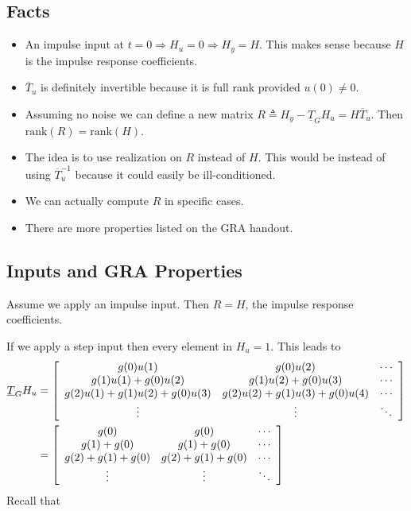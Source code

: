 \subsection{Facts}
\begin{itemize}
\item An impulse input at $t=0\Rightarrow H_u=0\Rightarrow H_y=H$.
  This makes sense because $H$ is the impulse response coefficients.
\item $\overline{T}_u$ is definitely invertible because it is full rank provided $u(0)\neq0$.
\item Assuming no noise we can define a new matrix $R\triangleq H_y-\underline{T}_G H_u = H\overline{T}_u$.
  Then $\text{rank}(R) = \text{rank}(H)$.
\item The idea is to use realization on $R$ instead of $H$.
  This would be instead of using $\overline{T}_u^{-1}$ because it could easily be ill-conditioned.
\item We can actually compute $R$ in specific cases.
\item There are more properties listed on the GRA handout.
\end{itemize}

\subsection{Inputs and GRA Properties}
Assume we apply an impulse input.
Then $R=H$, the impulse response coefficients.

If we apply a step input then every element in $H_u = 1$.
This leads to
\begin{align*}
\underline{T}_G H_u &= \left[\begin{array}{c c c}
g(0)u(1) & g(0)u(2) & \cdots \\
g(1)u(1)+g(0)u(2) & g(1)u(2)+g(0)u(3) & \cdots \\
g(2)u(1)+g(1)u(2)+g(0)u(3) & g(2)u(2)+g(1)u(3)+g(0)u(4) & \cdots \\
\vdots & \vdots & \ddots
\end{array}\right] \\
&= \left[\begin{array}{c c c}
g(0) & g(0) & \cdots \\
g(1)+g(0) & g(1)+g(0) & \cdots \\
g(2)+g(1)+g(0) & g(2)+g(1)+g(0) & \cdots \\
\vdots & \vdots & \ddots
\end{array}\right]
\end{align*}
Recall that

